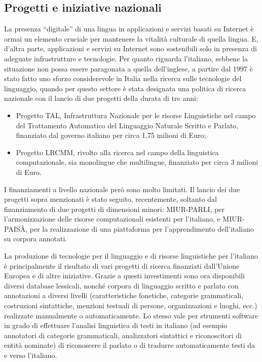 \documentclass[]{../../metanetpaper}
\begin{document}
\begin{multicols}{2}
\subsection{Progetti e iniziative nazionali}

La presenza “digitale” di una lingua in applicazioni e servizi basati su Internet \`{e} ormai un elemento cruciale per mantenere la vitalit\`{a} culturale di quella lingua. E, d'altra parte, applicazioni e servizi su Internet sono sostenibili solo in presenza di adeguate infrastrutture e tecnologie. Per quanto riguarda l'italiano, sebbene la situazione non possa essere paragonata a quella dell'inglese, a partire dal 1997 \`{e} stato fatto uno sforzo considerevole in Italia nella ricerca sulle tecnologie del linguaggio, quando per questo settore \`{e} stata designata una politica di ricerca nazionale con il lancio di due progetti della durata di tre anni:


\begin{itemize}
\item Progetto TAL, Infrastruttura Nazionale per le risorse Linguistiche nel campo del Trattamento Automatico del Linguaggio Naturale Scritto e Parlato, finanziato dal governo italiano per circa 1,75 milioni di Euro;
\item Progetto LRCMM, rivolto alla ricerca nel campo della linguistica computazionale, sia monolingue che multilingue, finanziato per circa 3 milioni di Euro.
\end{itemize}


I finanziamenti a livello nazionale per\`{o} sono molto limitati. Il lancio dei due progetti sopra menzionati \`{e} stato seguito, recentemente, soltanto dal finanziamento di due progetti di dimensioni minori: MIUR-PARLI, per l'armonizzazione delle risorse computazionali esistenti per l'italiano, e MIUR-PAIS\`{A}, per la realizzazione di una piattaforma per l'apprendimento dell'italiano su corpora annotati.

La produzione di tecnologie per il linguaggio e di risorse linguistiche per l'italiano \`{e} principalmente il risultato di vari progetti di ricerca finanziati dall'Unione Europea e di altre iniziative. Grazie a questi investimenti sono ora disponibili diversi database lessicali, nonch\'{e} corpora di linguaggio scritto e parlato con annotazioni a diversi livelli (caratteristiche fonetiche, categorie grammaticali, costruzioni sintattiche, menzioni testuali di persone, organizzazioni e luoghi, ecc.) realizzate manualmente o automaticamente. Lo stesso vale per strumenti software in grado di effettuare l'analisi linguistica di testi in italiano (ad esempio annotatori di categorie grammaticali, analizzatori sintattici e riconoscitori di entit\`{a} nominate) di riconoscere il parlato o di tradurre automaticamente testi da e verso l'italiano.


\end{multicols}
\end{document}
